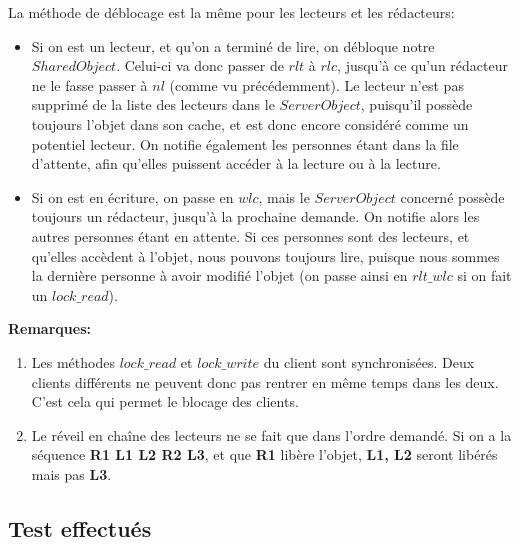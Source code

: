 \documentclass[11pt,a4paper]{report}
\begin{document}
La méthode de déblocage est la même pour les lecteurs et les rédacteurs: 
\begin{itemize}
\item Si on est un lecteur, et qu'on a terminé de lire, on débloque notre $SharedObject$. Celui-ci va donc passer de $rlt$ à $rlc$, jusqu'à ce qu'un rédacteur ne le fasse passer à $nl$ (comme vu précédemment). Le lecteur n'est pas supprimé de la liste des lecteurs dans le $ServerObject$, puisqu'il possède toujours l'objet dans son cache, et est donc encore considéré comme un potentiel lecteur. On notifie également les personnes étant dans la file d'attente, afin qu'elles puissent accéder à la lecture ou à la lecture.
\item Si on est en écriture, on passe en $wlc$, mais le $ServerObject$ concerné possède toujours un rédacteur, jusqu'à la prochaine demande. On notifie alors les autres personnes étant en attente. Si ces personnes sont des lecteurs, et qu'elles accèdent à l'objet, nous pouvons toujours lire, puisque nous sommes la dernière personne à avoir modifié l'objet (on passe ainsi en $rlt\_wlc$ si on fait un $lock\_read$).
\end{itemize}

\textbf{Remarques:}
\begin{enumerate}
\item Les méthodes $lock\_read$ et $lock\_write$ du client sont synchronisées. Deux clients différents ne peuvent donc pas rentrer en même temps dans les deux. C'est cela qui permet le blocage des clients. 
\item Le réveil en chaîne des lecteurs ne se fait que dans l'ordre demandé. Si on a la séquence \textbf{R1 L1 L2 R2 L3}, et que \textbf{R1} libère l'objet, \textbf{L1, L2} seront libérés mais pas \textbf{L3}.
\end{enumerate}

\subsection{Test effectués}
\end{document}
